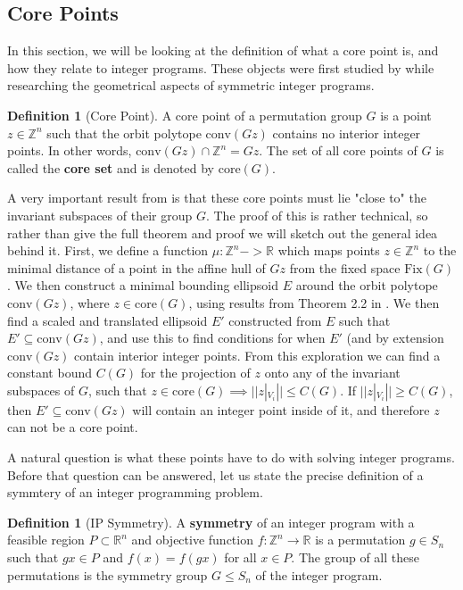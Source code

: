 \documentclass[11pt]{article} %
\theoremstyle{definition}
\newtheorem{definition}[theorem]{Definition}
\theoremstyle{remark}
\newcommand{\ZZ}{\mathbb{Z}}
\newcommand{\RR}{\mathbb{R}}
\begin{document}
\subsection{Core Points}

In this section, we will be looking at the definition of what a core point is, and how they relate to integer programs. These objects were first studied by \cite{some} while researching the geometrical aspects of symmetric integer programs.

\begin{definition}[Core Point]
A core point of a permutation group $G$ is a point $z \in \mathbb{Z}^n$ such that the orbit polytope $\textrm{conv}(Gz)$ contains no interior integer points. In other words, $\textrm{conv}(Gz) \cap \mathbb{Z}^n = Gz$. The set of all core points of $G$ is called the \textbf{core set} and is denoted by $\textrm{core}(G)$.
\end{definition}

A very important result from \cite{rehn} is that these core points must lie "close to" the invariant subspaces of their group $G$. The proof of this is rather technical, so rather than give the full theorem and proof we will sketch out the general idea behind it. First, we define a function $\mu : \ZZ^n -> \RR$ which maps points $z \in \ZZ^n$ to the minimal distance of a point in the affine hull of $Gz$ from the fixed space $\textrm{Fix}(G)$. We then construct a minimal bounding ellipsoid $E$ around the orbit polytope $\textrm{conv}(Gz)$, where $z \in \textrm{core}(G)$, using results from Theorem 2.2 in \cite{barvinok/blekherman}. We then find a scaled and translated ellipsoid $E'$ constructed from $E$ such that $E' \subseteq \textrm{conv}(Gz)$, and use this to find conditions for when $E'$ (and by extension $\textrm{conv}(Gz)$ contain interior integer points. From this exploration we can find a constant bound $C(G)$ for the projection of $z$ onto any of the invariant subspaces of $G$, such that $z \in \textrm{core}(G) \implies  ||z|_{V_i}|| \leq C(G)$. If $||z|_{V_i}|| \geq C(G)$, then $E' \subseteq \textrm{conv}(Gz)$ will contain an integer point inside of it, and therefore $z$ can not be a core point.

A natural question is what these points have to do with solving integer programs. Before that question can be answered, let us state the precise definition of a symmtery of an integer programming problem. 

\begin{definition}[IP Symmetry]
A \textbf{symmetry} of an integer program with a feasible region $P \subset \RR^n$ and objective function $f : \ZZ^n \rightarrow \RR$ is a permutation $g \in S_n$ such that $gx \in P$ and $f(x) = f(gx)$ for all $x \in P$. The group of all these permutations is the symmetry group $G \leq S_n$ of the integer program.
\end{definition}
\end{document}

